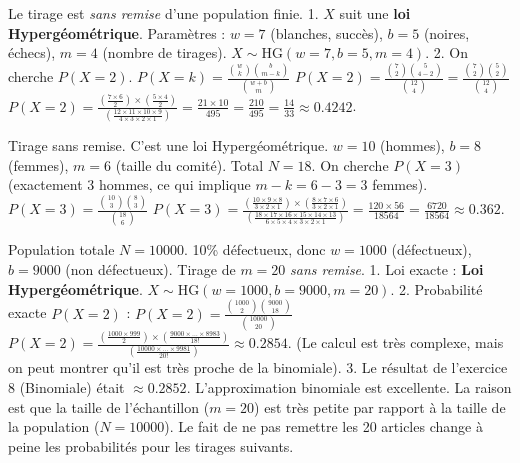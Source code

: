 
\begin{correctionbox}
Le tirage est \textit{sans remise} d'une population finie.
1.  $X$ suit une \textbf{loi Hypergéométrique}.
    Paramètres : $w=7$ (blanches, succès), $b=5$ (noires, échecs), $m=4$ (nombre de tirages).
    $X \sim \text{HG}(w=7, b=5, m=4)$.
2.  On cherche $P(X=2)$.
    $P(X=k) = \frac{\binom{w}{k} \binom{b}{m-k}}{\binom{w+b}{m}}$
    $P(X=2) = \frac{\binom{7}{2} \binom{5}{4-2}}{\binom{12}{4}} = \frac{\binom{7}{2} \binom{5}{2}}{\binom{12}{4}}$
    $P(X=2) = \frac{(\frac{7 \times 6}{2}) \times (\frac{5 \times 4}{2})}{(\frac{12 \times 11 \times 10 \times 9}{4 \times 3 \times 2 \times 1})} = \frac{21 \times 10}{495} = \frac{210}{495} = \frac{14}{33} \approx 0.4242$.
\end{correctionbox}

\begin{correctionbox}
Tirage sans remise. C'est une loi Hypergéométrique.
$w=10$ (hommes), $b=8$ (femmes), $m=6$ (taille du comité). Total $N=18$.
On cherche $P(X=3)$ (exactement 3 hommes, ce qui implique $m-k = 6-3=3$ femmes).
$P(X=3) = \frac{\binom{10}{3} \binom{8}{3}}{\binom{18}{6}}$
$P(X=3) = \frac{(\frac{10 \times 9 \times 8}{3 \times 2 \times 1}) \times (\frac{8 \times 7 \times 6}{3 \times 2 \times 1})}{(\frac{18 \times 17 \times 16 \times 15 \times 14 \times 13}{6 \times 5 \times 4 \times 3 \times 2 \times 1})} = \frac{120 \times 56}{18564} = \frac{6720}{18564} \approx 0.362$.
\end{correctionbox}

\begin{correctionbox}
Population totale $N=10000$. 10\% défectueux, donc $w=1000$ (défectueux), $b=9000$ (non défectueux).
Tirage de $m=20$ \textit{sans remise}.
1.  Loi exacte : \textbf{Loi Hypergéométrique}.
    $X \sim \text{HG}(w=1000, b=9000, m=20)$.
2.  Probabilité exacte $P(X=2)$ :
    $P(X=2) = \frac{\binom{1000}{2} \binom{9000}{18}}{\binom{10000}{20}}$
    $P(X=2) = \frac{(\frac{1000 \times 999}{2}) \times (\frac{9000 \times \dots \times 8983}{18!})}{(\frac{10000 \times \dots \times 9981}{20!})} \approx 0.2854$.
    (Le calcul est très complexe, mais on peut montrer qu'il est très proche de la binomiale).
3.  Le résultat de l'exercice 8 (Binomiale) était $\approx 0.2852$.
    L'approximation binomiale est excellente. La raison est que la taille de l'échantillon ($m=20$) est très petite par rapport à la taille de la population ($N=10000$). Le fait de ne pas remettre les 20 articles change à peine les probabilités pour les tirages suivants.
\end{correctionbox}

